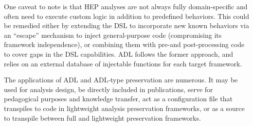 \documentclass[11pt]{article}
\begin{document}
One caveat to note is that \gls{HEP} analyses are not always fully domain-specific and often need to execute custom logic in addition to predefined behaviors.
This could be remedied either by extending the \gls{DSL} to incorporate new known behaviors via an ``escape'' mechanism to inject general-purpose code (compromising its framework independence), or combining them with pre-and post-processing code to cover gaps in the \gls{DSL} capabilities.
\gls{ADL}  follows the former approach, and relies on an external database of injectable functions for each target framework.

The applications of \gls{ADL} and \gls{ADL}-type preservation are numerous. It may be used for analysis design, be directly included in publications, serve for pedagogical purposes and knowledge transfer, 
act as a configuration file that transpiles to code in lightweight analysis preservation frameworks, or
as a source to transpile between full and lightweight preservation frameworks.


\end{document}
